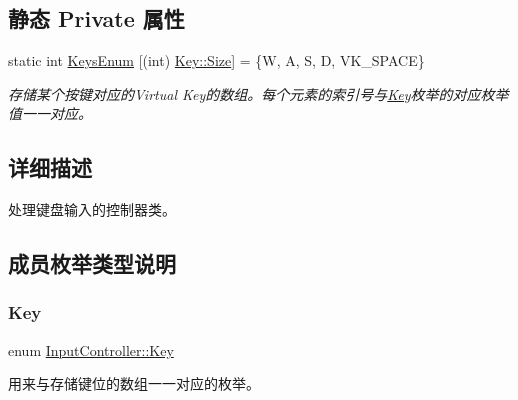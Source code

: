 \subsection*{静态 Private 属性}
\begin{DoxyCompactItemize}
\item 
static int \hyperlink{class_input_controller_afa9908a71b2107375b9104e51b465b06}{Keys\+Enum} \mbox{[}(int) \hyperlink{class_input_controller_a840a7425e2220e1ef5659a7ea4ba122da6f6cb72d544962fa333e2e34ce64f719}{Key\+::\+Size}\mbox{]} = \{\textquotesingle{}W\textquotesingle{}, \textquotesingle{}A\textquotesingle{}, \textquotesingle{}S\textquotesingle{}, \textquotesingle{}D\textquotesingle{}, V\+K\+\_\+\+S\+P\+A\+CE\}
\begin{DoxyCompactList}\small\item\em 存储某个按键对应的\+Virtual Key的数组。每个元素的索引号与\hyperlink{class_input_controller_a840a7425e2220e1ef5659a7ea4ba122d}{Key}枚举的对应枚举值一一对应。 \end{DoxyCompactList}\end{DoxyCompactItemize}


\subsection{详细描述}
处理键盘输入的控制器类。 



\subsection{成员枚举类型说明}
\mbox{\label{class_input_controller_a840a7425e2220e1ef5659a7ea4ba122d}} 
\subsubsection{\texorpdfstring{Key}{Key}}
{\footnotesize\ttfamily enum \hyperlink{class_input_controller_a840a7425e2220e1ef5659a7ea4ba122d}{Input\+Controller\+::\+Key}\hspace{0.3cm}{\ttfamily [strong]}}



用来与存储键位的数组一一对应的枚举。 

